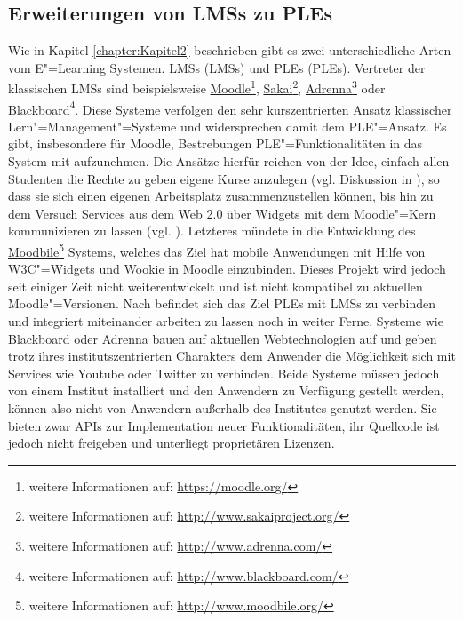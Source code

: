 \subsection{Erweiterungen von \acsp{LMS} zu \acsp{PLE}}
Wie in Kapitel \ref{chapter:Kapitel2} beschrieben gibt es zwei unterschiedliche Arten vom E"=Learning Systemen. \aclp{LMS} (\acp{LMS}) und \aclp{PLE} (\acp{PLE}). Vertreter der klassischen \acp{LMS} sind beispielsweise \href{https://moodle.org/}{Moodle}\footnote{weitere Informationen auf: \url{https://moodle.org/}}, \href{http://www.sakaiproject.org/}{Sakai}\footnote{weitere Informationen auf: \url{http://www.sakaiproject.org/}}, \href{http://www.adrenna.com/}{Adrenna}\footnote{weitere Informationen auf: \url{http://www.adrenna.com/}} oder \href{http://www.blackboard.com/}{Blackboard}\footnote{weitere Informationen auf: \url{http://www.blackboard.com/}}. Diese Systeme verfolgen den sehr kurszentrierten Ansatz klassischer Lern"=Management"=Systeme und widersprechen damit dem \ac{PLE}"=Ansatz. Es gibt, insbesondere für Moodle, Bestrebungen \ac{PLE}"=Funktionalitäten in das System mit aufzunehmen. Die Ansätze hierfür reichen von der Idee, einfach allen Studenten die Rechte zu geben eigene Kurse anzulegen (vgl. Diskussion in \cite{MoodleForum2009}), so dass sie sich einen eigenen Arbeitsplatz zusammenzustellen können, bis hin zu dem Versuch Services aus dem Web 2.0 über Widgets mit dem Moodle"=Kern kommunizieren zu lassen (vgl. \cite{Penalvo2011}). Letzteres mündete in die Entwicklung des \href{http://www.moodbile.org/}{Moodbile}\footnote{weitere Informationen auf: \url{http://www.moodbile.org/}} Systems, welches das Ziel hat mobile Anwendungen mit Hilfe von \ac{W3C}"=Widgets und Wookie in Moodle einzubinden. Dieses Projekt wird jedoch seit einiger Zeit nicht weiterentwickelt und ist nicht kompatibel zu aktuellen Moodle"=Versionen. Nach \cite{Penalvo2011} befindet sich das Ziel \acp{PLE} mit \acp{LMS} zu verbinden und integriert miteinander arbeiten zu lassen noch in weiter Ferne. Systeme wie Blackboard oder Adrenna bauen auf aktuellen Webtechnologien auf und geben trotz ihres institutszentrierten Charakters dem Anwender die Möglichkeit sich mit Services wie Youtube oder Twitter zu verbinden. Beide Systeme müssen jedoch von einem Institut installiert und den Anwendern zu Verfügung gestellt werden, können also nicht von Anwendern außerhalb des Institutes genutzt werden. Sie bieten zwar \acp{API} zur Implementation neuer Funktionalitäten, ihr Quellcode ist jedoch nicht freigeben und unterliegt proprietären Lizenzen.

